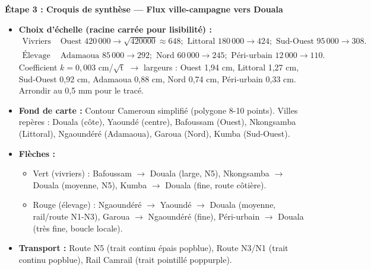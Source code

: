 \documentclass[11pt]{article}
\begin{document}
\begin{exoresolu}
\textbf{Étape 3 : Croquis de synthèse — Flux ville-campagne vers Douala}
\begin{itemize}
    \item \textbf{Choix d'échelle (racine carrée pour lisibilité) :} 
    \begin{align*}
        \text{Vivriers : } & \text{Ouest } 420\,000 \rightarrow \sqrt{420000} \approx 648 ; \text{ Littoral } 180\,000 \rightarrow 424 ; \text{ Sud-Ouest } 95\,000 \rightarrow 308. \\
        \text{Élevage : } & \text{Adamaoua } 85\,000 \rightarrow 292 ; \text{ Nord } 60\,000 \rightarrow 245 ; \text{ Péri-urbain } 12\,000 \rightarrow 110.
    \end{align*}
    Coefficient $k = 0,003$ cm/$\sqrt{\text{t}}$ $\rightarrow$ largeurs : Ouest 1,94 cm, Littoral 1,27 cm, Sud-Ouest 0,92 cm, Adamaoua 0,88 cm, Nord 0,74 cm, Péri-urbain 0,33 cm. Arrondir au 0,5 mm pour le tracé.
    \item \textbf{Fond de carte :} Contour Cameroun simplifié (polygone 8-10 points). Villes repères : Douala (côte), Yaoundé (centre), Bafoussam (Ouest), Nkongsamba (Littoral), Ngaoundéré (Adamaoua), Garoua (Nord), Kumba (Sud-Ouest).
    \item \textbf{Flèches :} 
    \begin{itemize}
        \item Vert (vivriers) : Bafoussam $\rightarrow$ Douala (large, N5), Nkongsamba $\rightarrow$ Douala (moyenne, N5), Kumba $\rightarrow$ Douala (fine, route côtière).
        \item Rouge (élevage) : Ngaoundéré $\rightarrow$ Yaoundé $\rightarrow$ Douala (moyenne, rail/route N1-N3), Garoua $\rightarrow$ Ngaoundéré (fine), Péri-urbain $\rightarrow$ Douala (très fine, boucle locale).
    \end{itemize}
    \item \textbf{Transport :} Route N5 (trait continu épais popblue), Route N3/N1 (trait continu popblue), Rail Camrail (trait pointillé poppurple).
\end{itemize}


\end{exoresolu}
\end{document}
